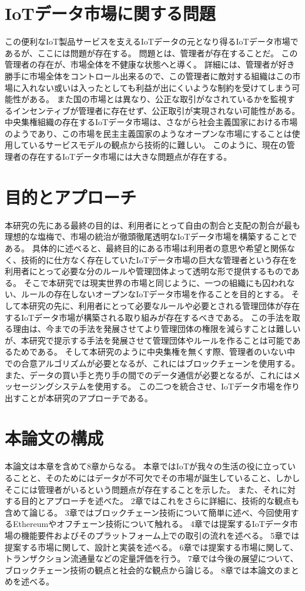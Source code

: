 \section{IoTデータ市場に関する問題}
この便利なIoT製品サービスを支えるIoTデータの元となり得るIoTデータ市場であるが、ここには問題が存在する。
問題とは、管理者が存在することだ。
この管理者の存在が、市場全体を不健康な状態へと導く。
詳細には、管理者が好き勝手に市場全体をコントロール出来るので、この管理者に敵対する組織はこの市場に入れない或いは入ったとしても利益が出にくいような制約を受けてしまう可能性がある。
また国の市場とは異なり、公正な取引がなされているかを監視するインセンティブが管理者に存在せず、公正取引が実現されない可能性がある。
中央集権組織の存在するIoTデータ市場は、さながら社会主義国家における市場のようであり、この市場を民主主義国家のようなオープンな市場にすることは使用しているサービスモデルの観点から技術的に難しい。
このように、現在の管理者の存在するIoTデータ市場には大きな問題点が存在する。

\section{目的とアプローチ}
本研究の先にある最終の目的は、利用者にとって自由の割合と支配の割合が最も理想的な塩梅で、市場の統治が徹頭徹尾透明なIoTデータ市場を構築することである。
具体的に述べると、最終目的にある市場は利用者の意思や希望と関係なく、技術的に仕方なく存在していたIoTデータ市場の巨大な管理者という存在を利用者にとって必要な分のルールや管理団体よって透明な形で提供するものである。
そこで本研究では現実世界の市場と同じように、一つの組織にも囚われない、ルールの存在しないオープンなIoTデータ市場を作ることを目的とする。
そして本研究の先に、利用者にとって必要なルールや必要とされる管理団体が存在するIoTデータ市場が構築される取り組みが存在するべきである。
この手法を取る理由は、今までの手法を発展させてより管理団体の権限を減らすことは難しいが、本研究で提示する手法を発展させて管理団体やルールを作ることは可能であるためである。
そして本研究のように中央集権を無くす際、管理者のいない中での合意アルゴリズムが必要となるが、これにはブロックチェーンを使用する。
また、データの買い手と売り手の間でのデータ通信が必要となるが、これにはメッセージングシステムを使用する。
この二つを統合させ、IoTデータ市場を作り出すことが本研究のアプローチである。

\section{本論文の構成}
本論文は本章を含めて8章からなる。
本章ではIoTが我々の生活の役に立っていることと、そのためにはデータが不可欠でその市場が誕生していること、しかしそこには管理者がいるという問題点が存在することを示した。
また、それに対する目的とアプローチを述べた。
2章ではこれをさらに詳細に、技術的な観点も含めて論じる。
3章ではブロックチェーン技術について簡単に述べ、今回使用するEthereumやオフチェーン技術について触れる。
4章では提案するIoTデータ市場の機能要件およびそのプラットフォーム上での取引の流れを述べる。
5章では提案する市場に関して、設計と実装を述べる。
6章では提案する市場に関して、トランザクション流通量などの定量評価を行う。
7章では今後の展望について、ブロックチェーン技術の観点と社会的な観点から論じる。
8章では本論文のまとめを述べる。